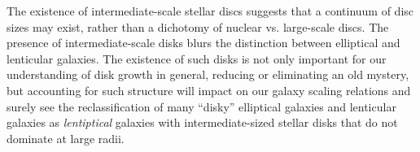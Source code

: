 \documentclass[12pt,preprint]{nature}
\begin{document}


 


The existence of intermediate-scale stellar discs suggests that a continuum of disc sizes may exist, 
rather than a dichotomy of nuclear vs. large-scale discs.  
The presence of intermediate-scale disks blurs the distinction between elliptical and lenticular galaxies.
The existence of such disks is not only important for our understanding of disk growth in general, 
reducing or eliminating an old mystery, 
but accounting for such structure will impact on our galaxy scaling relations 
and surely see the reclassification of many ``disky'' elliptical galaxies 
and lenticular galaxies as \emph{lentiptical} 
galaxies with intermediate-sized stellar disks that do not dominate at large radii. 



 







\end{document}
